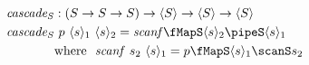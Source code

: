 \documentclass[preview]{standalone}
\begin{document}
\begin{align*}%
  \mathit{cascade_S} &: (S \rightarrow S \rightarrow S) \rightarrow \vect{S} \rightarrow \vect{S} \rightarrow \vect{S}\\
  \mathit{cascade_S} &\ p\ \vect{s}_1\ \vect{s}_2 = \mathit{scanf} \fMapS \vect{s}_2 \pipeS \vect{s}_1 \\
                     &\text{where}\ \ \mathit{scanf}\ s_2\ \vect{s}_1 = p \fMapS \vect{s}_1 \scanS s_2 %
\end{align*}
\end{document}

